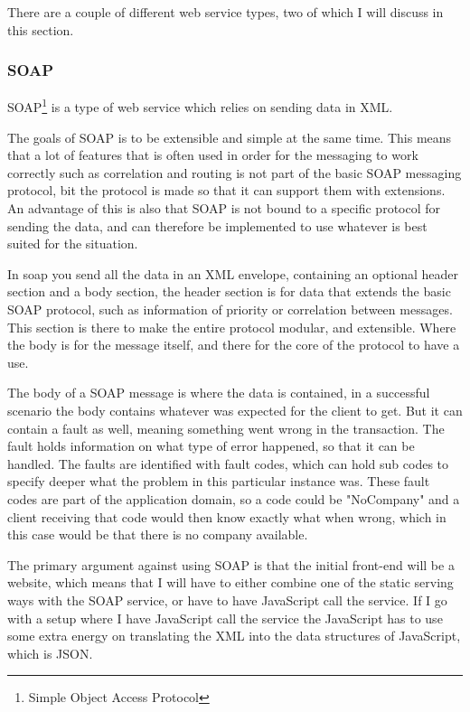 There are a couple of different web service types, two of which I will discuss
in this section. 

\subsubsection{SOAP}
\label{subs:SOAP}
SOAP\footnote{Simple Object Access Protocol} is a type of web service which
relies on sending data in XML. 

The goals of SOAP is to be extensible and simple at the same
time\cite{soap:messaging}. This means that a lot of features that is often used
in order for the messaging to work correctly such as correlation and routing is
not part of the basic SOAP messaging protocol, bit the protocol is made so that
it can support them with extensions. An advantage of this is also that SOAP is
not bound to a specific protocol for sending the data, and can therefore be
implemented to use whatever is best suited for the situation. 

In soap you send all the data in an XML envelope, containing an optional header
section and a body section, the header section is for data that extends the
basic SOAP protocol, such as information of priority or correlation between
messages\cite{soap:messaging}. This section is there to make the entire protocol
modular, and extensible. Where the body is for the message itself, and there for
the core of the protocol to have a use. 

The body of a SOAP message is where the data is contained, in a successful
scenario the body contains whatever was expected for the client to get. But it
can contain a fault as well, meaning something went wrong in the transaction.
The fault holds information on what type of error happened, so that it can be
handled. The faults are identified with fault codes, which can hold sub codes to
specify deeper what the problem in this particular instance was. These fault
codes are part of the application domain, so a code could be "NoCompany" and a
client receiving that code would then know exactly what when wrong, which in
this case would be that there is no company available. 

The primary argument against using SOAP is that the initial front-end will be a
website, which means that I will have to either combine one of the static
serving ways with the SOAP service, or have to have JavaScript call the service.
If I go with a setup where I have JavaScript call the service the JavaScript has
to use some extra energy on translating the XML into the data structures of
JavaScript, which is JSON. 

